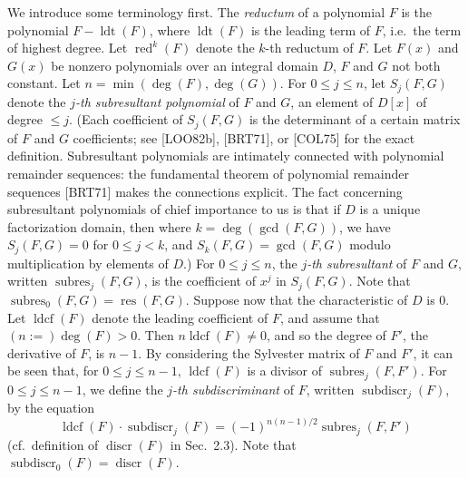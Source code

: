 \documentclass[11pt]{article}
\theoremstyle{plain}
\theoremstyle{definition}
\DeclareMathOperator{\res}{res}
\DeclareMathOperator{\discr}{discr}
\DeclareMathOperator{\subres}{subres}
\DeclareMathOperator{\subdiscr}{subdiscr}
\DeclareMathOperator{\red}{red}
\DeclareMathOperator{\ldcf}{ldcf}
\DeclareMathOperator{\ldt}{ldt}
\DeclareMathOperator{\gcdop}{gcd}
\begin{document}
We introduce some terminology first. The \emph{reductum} of a polynomial
$F$ is the polynomial $F - \ldt(F)$, where $\ldt(F)$ is the leading term
of $F$, i.e.\ the term of highest degree. Let $\red^k(F)$ denote the
$k$-th reductum of $F$. Let $F(x)$ and $G(x)$ be nonzero polynomials
over an integral domain $D$, $F$ and $G$ not both constant. Let
$n = \min(\deg(F), \deg(G))$. For $0 \le j \le n$, let $S_j(F, G)$
denote the \emph{$j$-th subresultant polynomial} of $F$ and $G$, an
element of $D[x]$ of degree $\le j$. (Each coefficient of $S_j(F, G)$
is the determinant of a certain matrix of $F$ and $G$ coefficients;
see [LOO82b], [BRT71], or [COL75] for the exact definition. Subresultant
polynomials are intimately connected with polynomial remainder
sequences: the fundamental theorem of polynomial remainder sequences
[BRT71] makes the connections explicit. The fact concerning subresultant
polynomials of chief importance to us is that if $D$ is a unique
factorization domain, then where $k = \deg(\gcdop(F, G))$, we have
$S_j(F, G) = 0$ for $0 \le j < k$, and $S_k(F, G) = \gcdop(F, G)$ modulo
multiplication by elements of $D$.) For $0 \le j \le n$, the
\emph{$j$-th subresultant} of $F$ and $G$, written $\subres_j(F, G)$,
is the coefficient of $x^j$ in $S_j(F, G)$. Note that
$\subres_0(F, G) = \res(F, G)$. Suppose now that the characteristic of
$D$ is $0$. Let $\ldcf(F)$ denote the leading coefficient of $F$, and
assume that $(n :=) \deg(F) > 0$. Then $n \ldcf(F) \ne 0$, and so the
degree of $F'$, the derivative of $F$, is $n-1$. By considering the
Sylvester matrix of $F$ and $F'$, it can be seen that, for
$0 \le j \le n-1$, $\ldcf(F)$ is a divisor of $\subres_j(F, F')$. For
$0 \le j \le n-1$, we define the \emph{$j$-th subdiscriminant} of $F$,
written $\subdiscr_j(F)$, by the equation
\[
\ldcf(F) \cdot \subdiscr_j(F) = (-1)^{n(n-1)/2} \subres_j(F, F')
\]
(cf.\ definition of $\discr(F)$ in Sec.~2.3). Note that
$\subdiscr_0(F) = \discr(F)$.
\end{document}
